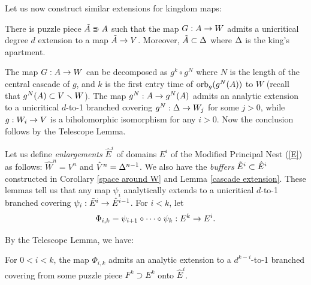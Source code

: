 Let us now construct similar extensions for kingdom maps: 

\begin{lem}\label{cascade extension}
 There is puzzle piece $\tilde A \Supset A$ such that  
the map $G: A \rightarrow W $  admits a unicritical degree $d$  extension to a map $\tilde A  \rightarrow V$.
Moreover, $\tilde A\subset {\Delta}$ where ${\Delta}$ is the king's apartment.
\end{lem}

\begin{pf}
The map $G: A\rightarrow W$ can be decomposed as $g^k\circ  g^N$ where $N$ is the length of the central cascade of $g$,
 and $k$ is the first entry time of $\operatorname{orb}_g (g^N(A))$ to $W$ (recall that $g^N(A)\subset V\smallsetminus W$). 
The map $g^N: A\rightarrow g^N(A)$ admits an analytic  extension to  a unicritical $d$-to-1 branched covering
$g^N: {\Delta}\rightarrow W_j$ for some $j>0$, while $g: W_i\rightarrow V$ is a biholomorphic isomorphism for any $i>0$.
Now the conclusion follows by the Telescope Lemma. 
\end{pf}


Let us define {\it enlargements} $\hat E^i$ of domains $E^i$
of the Modified Principal Nest (\ref{E})  as follows: 
$\hat W^n =V^n$ and $\hat V^n = {\Delta}^{n-1}$.
We also have the {\it buffers} $\tilde E^i\subset \hat E^i$
 constructed in Corollary  \ref{space around W} and Lemma \ref{cascade extension}.
These lemmas tell us that  any map $\psi_i$ analytically extends to a unicritical  $d$-to-1 branched covering 
$\psi_i: \tilde E^i\rightarrow \hat E^{i-1}$. 
 For $i<k$, let 
$$
  \Phi_{i,k} = \psi_{i+1}\circ\dots\circ \psi_k: E^k\rightarrow E^i.
$$

By the Telescope Lemma, we have:

\begin{lem}\label{Phi}
    For $0<i<k$, the map $\Phi_{i,k}$ admits an analytic extension to a $d^{k-i}$-to-1 branched covering
from some puzzle piece $F^k\supset E^k$ onto $\hat E^i$.
\end{lem}

